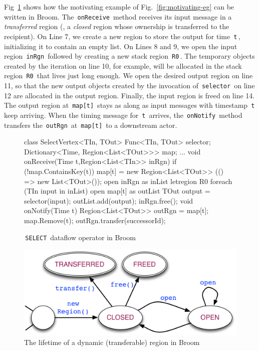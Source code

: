 \documentclass[a4paper,UKenglish]{lipics-v2018}
\newcommand{\C}[1]{\code{#1}}
\newcommand{\code}[1]{\,{\tt #1}\,}
\newcommand{\name}{{\sc Broom}\xspace}
\begin{document}
Fig~\ref{fig:motivating-eg-in-broom} shows how the motivating example
of Fig.~\ref{fig:motivating-eg} can be written in \name. The
\C{onReceive} method receives its input message in a
\emph{transferred} region (\ie, a \emph{closed} region whose ownership
is transferred to the recipient). On Line 7, we create a new region to
store the output for time \C{t}, initializing it to contain an empty
list. On Lines 8 and 9, we open the input region \C{inRgn} followed by
creating a new stack region \C{R0}. The temporary objects created by
the iteration on line 10, for example, will be allocated in the stack
region \C{R0} that lives just long enough.  We open the desired output
region on line 11, so that the new output objects created by the
invocation of \C{selector} on line 12 are allocated in the output
region.  Finally, the input region is freed on line 14. The output
region at \C{map[t]} stays as along as input messages with timestamp
\C{t} keep arriving. When the timing message for \C{t} arrives, the
\C{onNotify} method transfers the \C{outRgn} at \C{map[t]} to a
downstream actor.

\begin{figure}[t!]
\begin{numcodejava}
class SelectVertex<TIn, TOut> {
  Func<TIn, TOut> selector;
  Dictionary<Time, Region<List<TOut>>> map;
  ...
  void onReceive(Time t,Region<List<TIn>> inRgn){
    if (!map.ContainsKey(t))
       map[t] = new Region<List<TOut>> (() => new List<TOut>());
    open inRgn as inList {
      letregion R0 {
        foreach (TIn input in inList) {
          open map[t] as outList {
            TOut output = selector(input);
            outList.add(output); } } } }
    inRgn.free();
  }
  void onNotify(Time t) {
     Region<List<TOut>> outRgn = map[t];
     map.Remove(t);
     outRgn.transfer(successorId);
  }
}
\end{numcodejava}
\caption{\C{SELECT} dataflow operator in \name}
\label{fig:motivating-eg-in-broom}
\vspace*{-0.15in}
\end{figure}

\begin{figure} 
\includegraphics[scale=0.45]{region-fsm.png}
\caption{The lifetime of a dynamic (transferable) region in \name}
\label{fig:region-fsm} 
\vspace*{-0.1in} 
\end{figure}
\end{document}
